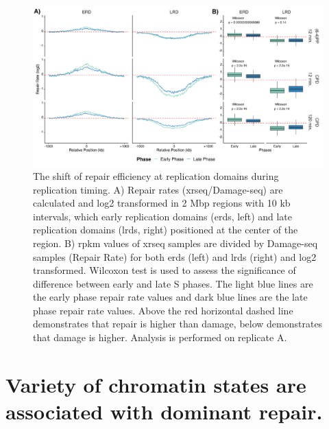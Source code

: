 \begin{figure}[H]
    \begin{center}
    \includegraphics[width=\textwidth]{Chapters/4_results/figures/fig2}
    \caption[The shift of repair efficiency at replication domains during replication timing.]{The shift of repair efficiency at replication domains during replication timing. A) Repair rates (\gls{xrseq}/Damage-seq) are calculated and log2 transformed in 2 Mbp regions with 10 kb intervals, which early replication domains (\gls{erd}s, left) and late replication domains (\gls{lrd}s, right) positioned at the center of the region. B) \gls{rpkm} values of \gls{xrseq} samples are divided by Damage-seq samples (Repair Rate) for both \gls{erd}s (left) and \gls{lrd}s (right) and log2 transformed. Wilcoxon test is used to assess the significance of difference between early and late S phases. The light blue lines are the early phase repair rate values and dark blue lines are the late phase repair rate values. Above the red horizontal dashed line demonstrates that repair is higher than damage, below demonstrates that damage is higher. Analysis is performed on replicate A.}
    \label{fig:repdomain}
    \end{center}
    \end{figure}

\section{Variety of chromatin states are associated with dominant repair.}

